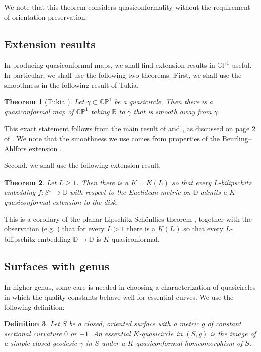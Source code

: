 \documentclass[12pt,a4paper]{amsart}
\newcommand{\bbR}{\mathbb R}
\newcommand{\CP}{\mathbb{CP}}
\newcommand{\bbD}{\mathbb D}
\theoremstyle{definition}
\theoremstyle{plain}
\newtheorem{theorem}{Theorem}[section]
\newtheorem{definition}[theorem]{Definition}
\numberwithin{equation}{section}
\begin{document}
We note that this theorem considers quasiconformality without the requirement of orientation-preservation.

\subsection*{Extension results} In producing quasiconformal maps, we shall find extension results in $\CP^1$ useful.
In particular, we shall use the following two theorems.
First, we shall use the smoothness in the following result of Tukia.

\begin{theorem}[Tukia {\cite{tukia1981extension}}]\label{thm-smooth-away-from-bad}
    Let $\gamma \subset \CP^1$ be a quasicircle.
    Then there is a quasiconformal map of $\CP^1$ taking $\bbR$ to $\gamma$ that is smooth away from $\gamma$.
\end{theorem}
This exact statement follows from the main result of \cite{tukia1981extension} and \cite[Theorem 4.9]{tukiaVaisala1980quasisymmetric}, as discussed on page 2 of \cite{tukia1981extension}.
We note that the smoothness we use comes from properties of the Beurling--Ahlfors extension \cite{beurlingAhlfors1956boundary}.

Second, we shall use the following extension result.
\begin{theorem}\label{thm-bilip-extension}
    Let $L \geq 1$. Then there is a $K = K(L)$ so that every $L$-bilipschitz embedding $f: S^1 \to \bbD$ with respect to the Euclidean metric on $\bbD$ admits a $K$-quasiconformal extension to the disk.
\end{theorem}

This is a corollary of the planar Lipschitz Sch\"onflies theorem \cite[Theorem A]{tukia1980planarScoenflies}, together with the observation (e.g. \cite[\S 7]{tukia1981extension}) that for every $L > 1$ there is a $K(L)$ so that every $L$-bilipschitz embedding $\bbD \to \bbD$ is $K$-quasiconformal.





\subsection{Surfaces with genus} 
In higher genus, some care is needed in choosing a characterization of quasicircles in which the quality constants behave well for essential curves.
We use the following definition:

\begin{definition}\label{def-qcirc-on-genus}
    Let $S$ be a closed, oriented surface with a metric $g$ of constant sectional curvature $0$ or $-1$. An {\rm{essential $K$-quasicircle}} in $(S, g)$ is the image of a simple closed geodesic $\gamma$ in $S$ under a $K$-quasiconformal homeomorphism of $S$.
\end{definition}
\end{document}
